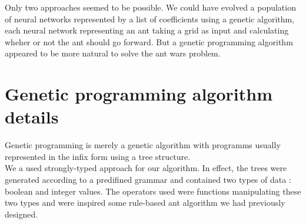 \documentclass[10pt,a4paper]{article}
\begin{document}
Only two approaches seemed to be possible. We could have evolved a
population of neural networks represented by a list of coefficients
using a genetic algorithm, each neural network representing an ant
taking a grid as input and calculating wheher or not the ant should go
forward. But a genetic programming algorithm appeared to be more
natural to solve the ant wars problem.

\section{Genetic programming algorithm details}

Genetic programming is merely a genetic algorithm with programms
usually represented in the infix form using a tree structure.\\

We a used strongly-typed approach for our algorithm. In effect, the
trees were generated according to a predifined grammar and contained
two types of data : boolean and integer values. The operators used
were functions manipulating these two types and were inspired some
rule-based ant algorithm we had previously designed.\\
\end{document}
